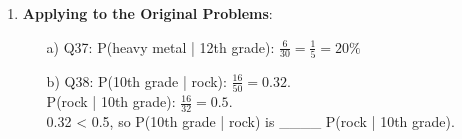 \documentclass[12pt]{article}
\begin{document}
\begin{enumerate}[label=37.\arabic*]
    \item \textbf{Applying to the Original Problems}:
    \begin{enumerate}
        \item[a)] Q37: P(heavy metal | 12th grade): \( \frac{6}{30} = \frac{1}{5} = 20\% \)
        \item[b)] Q38: P(10th grade | rock): \( \frac{16}{50} = 0.32 \). \\
        P(rock | 10th grade): \( \frac{16}{32} = 0.5 \). \\
        0.32 < 0.5, so P(10th grade | rock) is \_\_\_\_ P(rock | 10th grade).
    \end{enumerate}
\end{enumerate}

\end{document}

